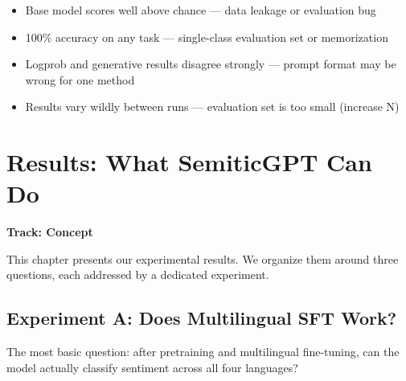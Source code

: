 \documentclass[11pt,a4paper]{article}
\begin{document}
\begin{failuresign}
\begin{itemize}[nosep]
  \item Base model scores well above chance --- data leakage or evaluation bug
  \item 100\% accuracy on any task --- single-class evaluation set or memorization
  \item Logprob and generative results disagree strongly --- prompt format may be wrong for one method
  \item Results vary wildly between runs --- evaluation set is too small (increase N)
\end{itemize}
\end{failuresign}


\section{Results: What SemiticGPT Can Do}
\label{ch:results}

\begin{center}
\colorbox{lightaccent}{\textbf{Track: Concept}}
\end{center}

This chapter presents our experimental results. We organize them around three questions, each addressed by a dedicated experiment.

\subsection{Experiment A: Does Multilingual SFT Work?}

The most basic question: after pretraining and multilingual fine-tuning, can the model actually classify sentiment across all four languages?
\end{document}
